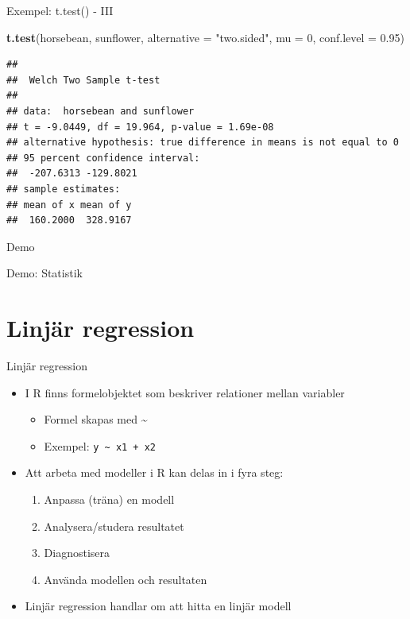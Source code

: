\documentclass[
  11pt,
  ignorenonframetext,
  handout]{beamer}
\newenvironment{Shaded}{\begin{snugshade}}{\end{snugshade}}
\newcommand{\AttributeTok}[1]{\textcolor[rgb]{0.13,0.29,0.53}{#1}}
\newcommand{\DecValTok}[1]{\textcolor[rgb]{0.00,0.00,0.81}{#1}}
\newcommand{\FloatTok}[1]{\textcolor[rgb]{0.00,0.00,0.81}{#1}}
\newcommand{\FunctionTok}[1]{\textcolor[rgb]{0.13,0.29,0.53}{\textbf{#1}}}
\newcommand{\NormalTok}[1]{#1}
\newcommand{\StringTok}[1]{\textcolor[rgb]{0.31,0.60,0.02}{#1}}
\providecommand{\tightlist}{%
  \setlength{\itemsep}{0pt}\setlength{\parskip}{0pt}}
\begin{document}
\begin{frame}[fragile]{Exempel: t.test() - III}
\protect{}\label{exempel-t.test---iii}
\begin{Shaded}
\begin{Highlighting}[]
\FunctionTok{t.test}\NormalTok{(horsebean, sunflower,}
       \AttributeTok{alternative =} \StringTok{"two.sided"}\NormalTok{,}
       \AttributeTok{mu =} \DecValTok{0}\NormalTok{, }\AttributeTok{conf.level =} \FloatTok{0.95}\NormalTok{)}
\end{Highlighting}
\end{Shaded}

\begin{verbatim}
## 
##  Welch Two Sample t-test
## 
## data:  horsebean and sunflower
## t = -9.0449, df = 19.964, p-value = 1.69e-08
## alternative hypothesis: true difference in means is not equal to 0
## 95 percent confidence interval:
##  -207.6313 -129.8021
## sample estimates:
## mean of x mean of y 
##  160.2000  328.9167
\end{verbatim}
\end{frame}

\begin{frame}{Demo}
\protect{}\label{demo-1}
\begin{block}{Demo: Statistik}
\protect{}\label{demo-statistik}
\end{block}
\end{frame}

\section{Linjär regression}\label{linjuxe4r-regression}

\begin{frame}[fragile]{Linjär regression}
\protect{}\label{linjuxe4r-regression-1}
\begin{itemize}
\tightlist
\item
  I R finns formelobjektet som beskriver relationer mellan variabler

  \begin{itemize}
  \tightlist
  \item
    Formel skapas med \textasciitilde{}
  \item
    Exempel: \texttt{y\ \textasciitilde{}\ x1\ +\ x2}
  \end{itemize}
\item
  Att arbeta med modeller i R kan delas in i fyra steg:

  \begin{enumerate}
  \tightlist
  \item
    Anpassa (träna) en modell
  \item
    Analysera/studera resultatet
  \item
    Diagnostisera
  \item
    Använda modellen och resultaten
  \end{enumerate}
\item
  Linjär regression handlar om att hitta en linjär modell
\end{itemize}
\end{frame}
\end{document}
